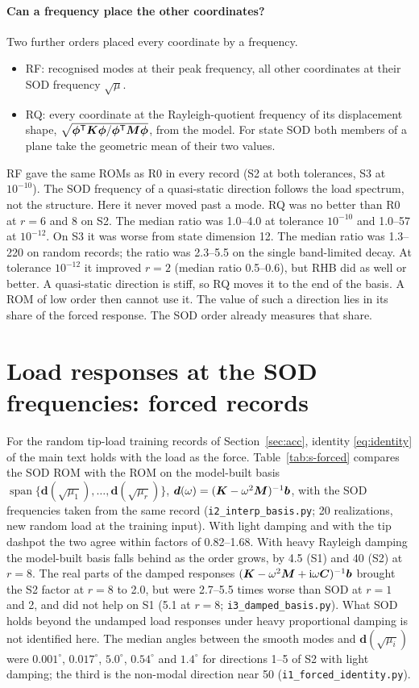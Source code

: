 \documentclass[11pt]{article}
\begin{document}
\paragraph{Can a frequency place the other coordinates?} Two further orders placed every coordinate by a frequency.
\begin{itemize}
\item RF: recognised modes at their peak frequency, all other coordinates at their SOD frequency $\sqrt{\mu}$.
\item RQ: every coordinate at the Rayleigh-quotient frequency of its displacement shape, $\sqrt{\bm{\phi}^{\mathsf T}\bm{K}\bm{\phi}/\bm{\phi}^{\mathsf T}\bm{M}\bm{\phi}}$, from the model. For state SOD both members of a plane take the geometric mean of their two values.
\end{itemize}
RF gave the same ROMs as R0 in every record (S2 at both tolerances, S3 at $10^{-10}$). The SOD frequency of a quasi-static direction follows the load spectrum, not the structure. Here it never moved past a mode.
RQ was no better than R0 at $r=6$ and 8 on S2. The median ratio was 1.0--4.0 at tolerance $10^{-10}$ and 1.0--57 at $10^{-12}$. On S3 it was worse from state dimension 12. The median ratio was 1.3--220 on random records; the ratio was 2.3--5.5 on the single band-limited decay.
At tolerance $10^{-12}$ it improved $r=2$ (median ratio 0.5--0.6), but RHB did as well or better. A quasi-static direction is stiff, so RQ moves it to the end of the basis. A ROM of low order then cannot use it.
The value of such a direction lies in its share of the forced response. The SOD order already measures that share.

\section{Load responses at the SOD frequencies: forced records}\label{sec:s-forced}
For the random tip-load training records of Section~\ref{sec:acc}, identity \eqref{eq:identity} of the main text holds with the load as the force. Table~\ref{tab:s-forced} compares the SOD ROM with the ROM on the model-built basis $\operatorname{span}\{\bm{d}(\sqrt{\mu_1}),\dots,\bm{d}(\sqrt{\mu_r})\}$, $\bm{d}(\omega)=(\bm{K}-\omega^2\bm{M})^{-1}\bm{b}$, with the SOD frequencies taken from the same record (\texttt{i2\_interp\_basis.py}; 20 realizations, new random load at the training input). With light damping and with the tip dashpot the two agree within factors of 0.82--1.68. With heavy Rayleigh damping the model-built basis falls behind as the order grows, by 4.5 (S1) and 40 (S2) at $r=8$. The real parts of the damped responses $(\bm{K}-\omega^2\bm{M}+\mathrm i\omega\bm{C})^{-1}\bm{b}$ brought the S2 factor at $r=8$ to 2.0, but were 2.7--5.5 times worse than SOD at $r=1$ and 2, and did not help on S1 (5.1 at $r=8$; \texttt{i3\_damped\_basis.py}). What SOD holds beyond the undamped load responses under heavy proportional damping is not identified here.
The median angles between the smooth modes and $\bm{d}(\sqrt{\mu_i})$ were $0.001^\circ$, $0.017^\circ$, $5.0^\circ$, $0.54^\circ$ and $1.4^\circ$ for directions 1--5 of S2 with light damping; the third is the non-modal direction near 50 (\texttt{i1\_forced\_identity.py}).
\end{document}
